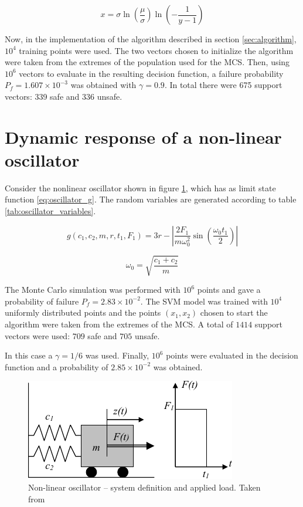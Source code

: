 \begin{equation} \label{eq:ITS}
	x = \sigma \ln{\left ( \frac{\mu}{\sigma} \right )} \ln{\left ( -\frac{1}{y-1} \right )}
\end{equation}

Now, in the implementation of the algorithm described in section \ref{sec:algorithm}, \(10^4\) training points were used. The two vectors chosen to initialize the algorithm were taken from the extremes of the population used for the \ac{MCS}. Then, using \(10^6\) vectors to evaluate in the resulting decision function, a failure probability \(P_f=1.607 \times 10^{-3}\) was obtained with \(\gamma=0.9\). In total there were 675 support vectors: 339 safe and 336 unsafe.

\section{Dynamic response of a non-linear oscillator} \label{sec:oscillator}

Consider the nonlinear oscillator shown in figure \ref{fig:oscillator}, which has as limit state function \ref{eq:oscillator_g}. The random variables are generated according to table \ref{tab:oscillator_variables}.

\begin{equation} \label{eq:oscillator_g}
	g (c_1, c_2, m, r, t_1, F_1)= 3r - \left | \frac{2F_1}{m \omega_0^2} \sin{\left ( \frac{\omega_0 t_1}{2} \right )} \right |
\end{equation}

\begin{equation} \label{eq:omega_0}
	\omega_0 = \sqrt{\frac{c_1 + c_2}{m}}
\end{equation}

The Monte Carlo simulation was performed with \(10^6\) points and gave a probability of failure  \(P_f = 2.83 \times 10^{-2}\). The \ac{SVM} model was trained with \(10^4\) uniformly distributed points and the points \((x_1, x_2)\) chosen to start the algorithm were taken from the extremes of the \ac{MCS}. A total of \(1414\) support vectors were used: \(709\) safe and \(705\) unsafe.

In this case a \( \gamma=1/6\) was used. Finally, \(10^6\) points were evaluated in the decision function and a probability of \(2.85 \times 10^{-2}\) was obtained.

\begin{figure}
	\myfloatalign
	\includegraphics[width=0.7\linewidth]{gfx/oscillator}
	\caption[Non-linear oscillator]{ Non-linear oscillator – system definition and applied load. Taken from \cite{Schueremans2005}}
	\label{fig:oscillator}
\end{figure}


